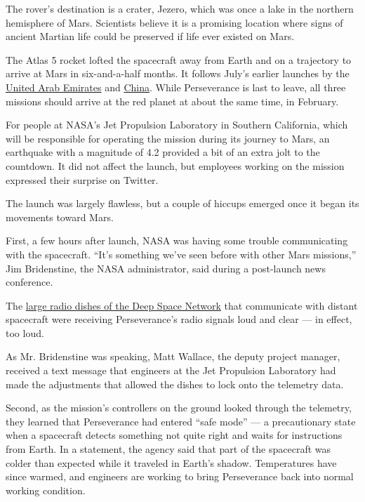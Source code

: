 The rover's destination is a crater, Jezero, which was once a lake in
the northern hemisphere of Mars. Scientists believe it is a promising
location where signs of ancient Martian life could be preserved if life
ever existed on Mars.

The Atlas 5 rocket lofted the spacecraft away from Earth and on a
trajectory to arrive at Mars in six-and-a-half months. It follows July's
earlier launches by the
\href{https://www.nytimes3xbfgragh.onion/2020/07/19/science/emirates-mars-mission.html}{United
Arab Emirates} and
\href{https://www.nytimes3xbfgragh.onion/2020/07/22/science/mars-china-launch.html}{China}.
While Perseverance is last to leave, all three missions should arrive at
the red planet at about the same time, in February.

For people at NASA's Jet Propulsion Laboratory in Southern California,
which will be responsible for operating the mission during its journey
to Mars, an earthquake with a magnitude of 4.2 provided a bit of an
extra jolt to the countdown. It did not affect the launch, but employees
working on the mission expressed their surprise on Twitter.

The launch was largely flawless, but a couple of hiccups emerged once it
began its movements toward Mars.

First, a few hours after launch, NASA was having some trouble
communicating with the spacecraft. ``It's something we've seen before
with other Mars missions,'' Jim Bridenstine, the NASA administrator,
said during a post-launch news conference.

The
\href{https://www.nytimes3xbfgragh.onion/2020/03/04/science/voyager-2-nasa-deep-space-network.html}{large
radio dishes of the Deep Space Network} that communicate with distant
spacecraft were receiving Perseverance's radio signals loud and clear
--- in effect, too loud.

As Mr. Bridenstine was speaking, Matt Wallace, the deputy project
manager, received a text message that engineers at the Jet Propulsion
Laboratory had made the adjustments that allowed the dishes to lock onto
the telemetry data.

Second, as the mission's controllers on the ground looked through the
telemetry, they learned that Perseverance had entered ``safe mode'' ---
a precautionary state when a spacecraft detects something not quite
right and waits for instructions from Earth. In a statement, the agency
said that part of the spacecraft was colder than expected while it
traveled in Earth's shadow. Temperatures have since warmed, and
engineers are working to bring Perseverance back into normal working
condition.


